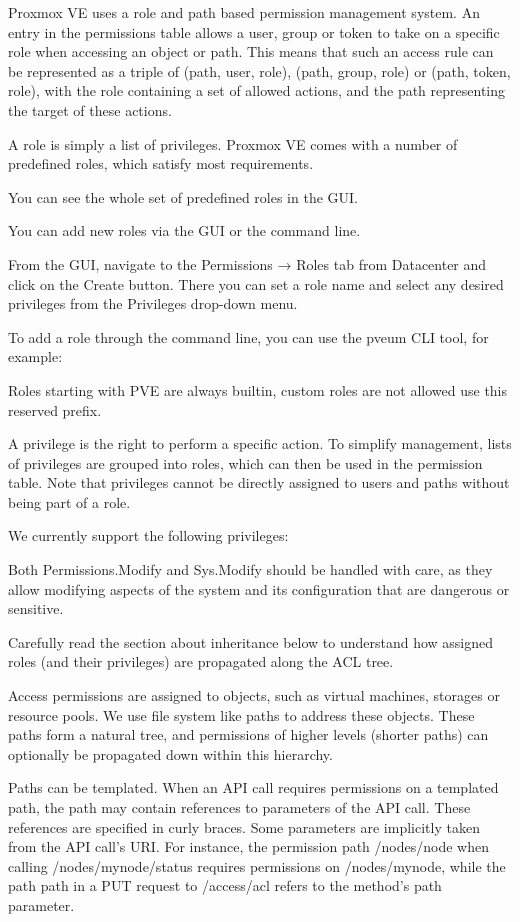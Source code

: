 Proxmox VE uses a role and path based permission management system. An entry in the permissions table allows a user, group or token to take on a specific role when accessing an object or path. This means that such an access rule can be represented as a triple of (path, user, role), (path, group, role) or (path, token, role), with the role containing a set of allowed actions, and the path representing the target of these actions.

A role is simply a list of privileges. Proxmox VE comes with a number of predefined roles, which satisfy most requirements.

You can see the whole set of predefined roles in the GUI.

You can add new roles via the GUI or the command line.

From the GUI, navigate to the Permissions → Roles tab from Datacenter and click on the Create button. There you can set a role name and select any desired privileges from the Privileges drop-down menu.

To add a role through the command line, you can use the pveum CLI tool, for example:

Roles starting with PVE are always builtin, custom roles are not allowed use this reserved prefix.

A privilege is the right to perform a specific action. To simplify management, lists of privileges are grouped into roles, which can then be used in the permission table. Note that privileges cannot be directly assigned to users and paths without being part of a role.

We currently support the following privileges:

Both Permissions.Modify and Sys.Modify should be handled with care, as they allow modifying aspects of the system and its configuration that are dangerous or sensitive.

Carefully read the section about inheritance below to understand how assigned roles (and their privileges) are propagated along the ACL tree.

Access permissions are assigned to objects, such as virtual machines, storages or resource pools. We use file system like paths to address these objects. These paths form a natural tree, and permissions of higher levels (shorter paths) can optionally be propagated down within this hierarchy.

Paths can be templated. When an API call requires permissions on a templated path, the path may contain references to parameters of the API call. These references are specified in curly braces. Some parameters are implicitly taken from the API call’s URI. For instance, the permission path /nodes/{node} when calling /nodes/mynode/status requires permissions on /nodes/mynode, while the path {path} in a PUT request to /access/acl refers to the method’s path parameter.

